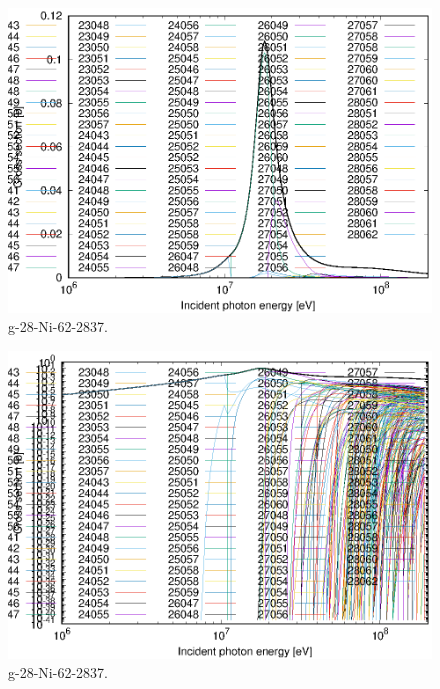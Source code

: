 \begin{figure}
 \includegraphics[width=\linewidth]{eps/g_28-Ni-62_2837.eps}
  \caption{g-28-Ni-62-2837.}
\end{figure}
\begin{figure}
 \includegraphics[width=\linewidth]{eps-log/g_28-Ni-62_2837.eps}
 \caption{g-28-Ni-62-2837.}
\end{figure}
\newpage \clearpage

